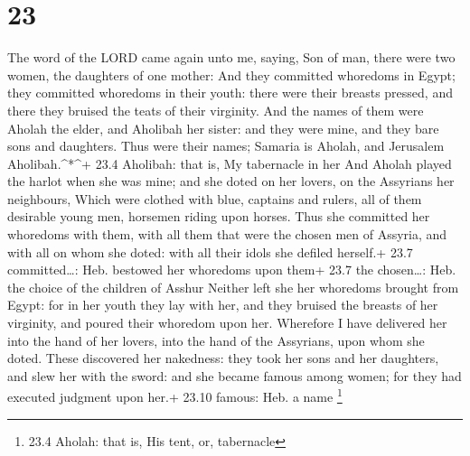 \hypertarget{section-22}{%
\section{23}\label{section-22}}

 The word of the LORD came again unto me, saying,
 Son of man, there were two women, the daughters of one
mother:  And they committed whoredoms in Egypt; they
committed whoredoms in their youth: there were their breasts pressed,
and there they bruised the teats of their virginity.  And
the names of them were Aholah the elder, and Aholibah her sister: and
they were mine, and they bare sons and daughters. Thus were their names;
Samaria is Aholah, and Jerusalem Aholibah.\^{}*\^{}+ 23.4 Aholibah: that
is, My tabernacle in her  And Aholah played the harlot when
she was mine; and she doted on her lovers, on the Assyrians her
neighbours,  Which were clothed with blue, captains and
rulers, all of them desirable young men, horsemen riding upon horses.
 Thus she committed her whoredoms with them, with all them
that were the chosen men of Assyria, and with all on whom she doted:
with all their idols she defiled herself.+ 23.7 committed\ldots: Heb.
bestowed her whoredoms upon them+ 23.7 the chosen\ldots: Heb. the choice
of the children of Asshur  Neither left she her whoredoms
brought from Egypt: for in her youth they lay with her, and they bruised
the breasts of her virginity, and poured their whoredom upon her.
 Wherefore I have delivered her into the hand of her lovers,
into the hand of the Assyrians, upon whom she doted.  These
discovered her nakedness: they took her sons and her daughters, and slew
her with the sword: and she became famous among women; for they had
executed judgment upon her.+ 23.10 famous: Heb. a name \footnote{23.4
  Aholah: that is, His tent, or, tabernacle}

